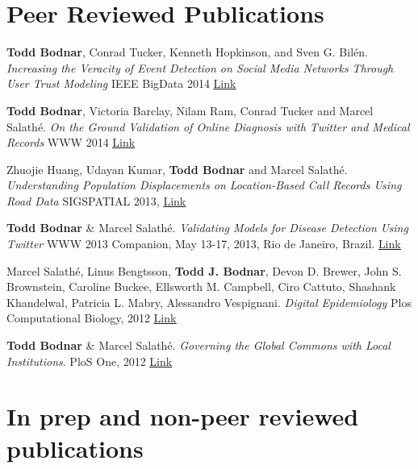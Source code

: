 \documentclass[margin,line]{res}
\newcommand{\linkToUrl}[1]{{\color{blue}\underline{\href{#1}{Link}}}}
\begin{document}
\begin{resume}
\newpage


\section{\sc Peer Reviewed Publications}

\begin{etaremune}[start=6,leftmargin=13pt]

\item \textbf{Todd Bodnar}, Conrad Tucker, Kenneth Hopkinson, and Sven G. Bil\'en. \textit{Increasing the Veracity of Event Detection on Social Media Networks Through User Trust Modeling} IEEE BigData 2014 \linkToUrl{http://bit.ly/18RqYCR}

\item \textbf{Todd Bodnar}, Victoria Barclay, Nilam Ram, Conrad Tucker and Marcel Salath\'e. \textit{On the Ground Validation of Online Diagnosis with Twitter and Medical Records} WWW 2014 \linkToUrl{http://bit.ly/R82tZp}

\item Zhuojie Huang, Udayan Kumar, \textbf{Todd Bodnar} and Marcel Salath\'e. \textit{Understanding Population Displacements on Location-Based Call Records Using Road Data} SIGSPATIAL 2013, \linkToUrl{http://bit.ly/1dAjC5o}

\item \textbf{Todd Bodnar} \& Marcel Salath\'e. \textit{Validating Models for Disease Detection Using Twitter}  WWW 2013 Companion, May 13-17, 2013, Rio de Janeiro, Brazil. \linkToUrl{http://bit.ly/WWL1Gr}

\item Marcel Salath\'e, Linus Bengtsson, \textbf{Todd J. Bodnar}, Devon D. Brewer, John S. Brownstein, Caroline Buckee, Ellsworth M. Campbell, Ciro Cattuto, Shashank Khandelwal, Patricia L. Mabry,  Alessandro Vespignani. \textit{Digital Epidemiology} Plos Computational Biology, 2012 \linkToUrl{http://bitly.com/PO2fSx}

\item \textbf{Todd Bodnar} \& Marcel Salath\'e. \textit{Governing the Global Commons with Local Institutions}. PloS One, 2012 \linkToUrl{http://bit.ly/TtsZd5}
\end{etaremune}

\section{\sc In prep and non-peer reviewed publications}


\end{resume}
\end{document}
